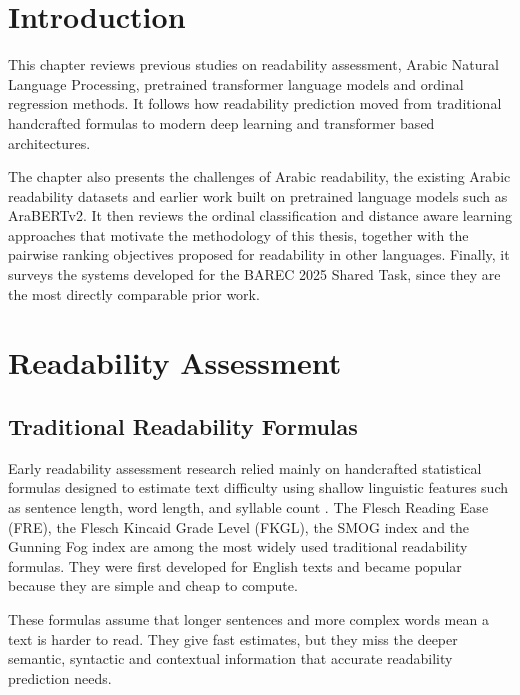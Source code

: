 \documentclass[12pt]{report}
\begin{document}
\section{Introduction}

This chapter reviews previous studies on readability assessment, Arabic Natural Language Processing, pretrained transformer language models and ordinal regression methods. It follows how readability prediction moved from traditional handcrafted formulas to modern deep learning and transformer based architectures.

The chapter also presents the challenges of Arabic readability, the existing Arabic readability datasets and earlier work built on pretrained language models such as AraBERTv2. It then reviews the ordinal classification and distance aware learning approaches that motivate the methodology of this thesis, together with the pairwise ranking objectives proposed for readability in other languages. Finally, it surveys the systems developed for the BAREC 2025 Shared Task, since they are the most directly comparable prior work.

\section{Readability Assessment}

\subsection{Traditional Readability Formulas}

Early readability assessment research relied mainly on handcrafted statistical formulas designed to estimate text difficulty using shallow linguistic features such as sentence length, word length, and syllable count \cite{dubay2004principles}.
The Flesch Reading Ease (FRE), the Flesch Kincaid Grade Level (FKGL), the SMOG index and the Gunning Fog index are among the most widely used traditional readability formulas. They were first developed for English texts and became popular because they are simple and cheap to compute.

These formulas assume that longer sentences and more complex words mean a text is harder to read. They give fast estimates, but they miss the deeper semantic, syntactic and contextual information that accurate readability prediction needs.
\end{document}
